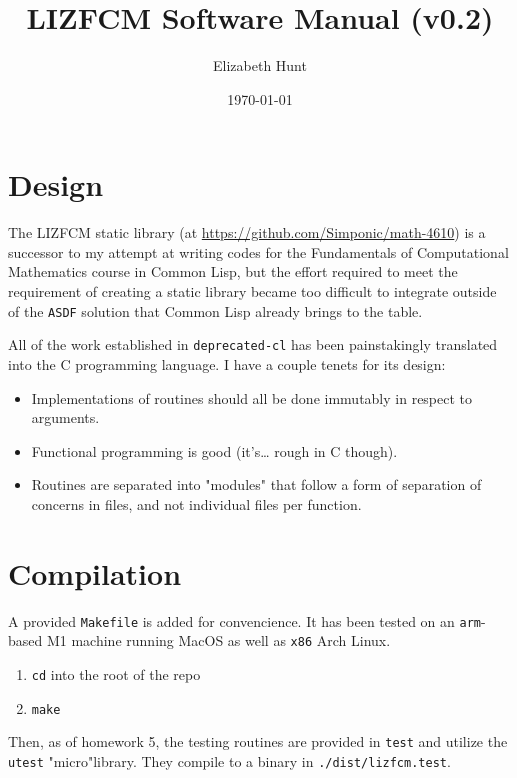 \documentclass[11pt]{article}
\author{Elizabeth Hunt}
\date{\today}
\title{LIZFCM Software Manual (v0.2)}
\begin{document}
\maketitle
\tableofcontents

\setlength\parindent{0pt}

\section{Design}
\label{sec:org9458aa0}
The LIZFCM static library (at \url{https://github.com/Simponic/math-4610}) is a successor to my
attempt at writing codes for the Fundamentals of Computational Mathematics course in Common
Lisp, but the effort required to meet the requirement of creating a static library became
too difficult to integrate outside of the \texttt{ASDF} solution that Common Lisp already brings
to the table.

All of the work established in \texttt{deprecated-cl} has been painstakingly translated into
the C programming language. I have a couple tenets for its design:

\begin{itemize}
\item Implementations of routines should all be done immutably in respect to arguments.
\item Functional programming is good (it's\ldots{} rough in C though).
\item Routines are separated into "modules" that follow a form of separation of concerns
in files, and not individual files per function.
\end{itemize}

\section{Compilation}
\label{sec:orge0bab70}
A provided \texttt{Makefile} is added for convencience. It has been tested on an \texttt{arm}-based M1 machine running
MacOS as well as \texttt{x86} Arch Linux.

\begin{enumerate}
\item \texttt{cd} into the root of the repo
\item \texttt{make}
\end{enumerate}

Then, as of homework 5, the testing routines are provided in \texttt{test} and utilize the
\texttt{utest} "micro"library. They compile to a binary in \texttt{./dist/lizfcm.test}.
\end{document}
